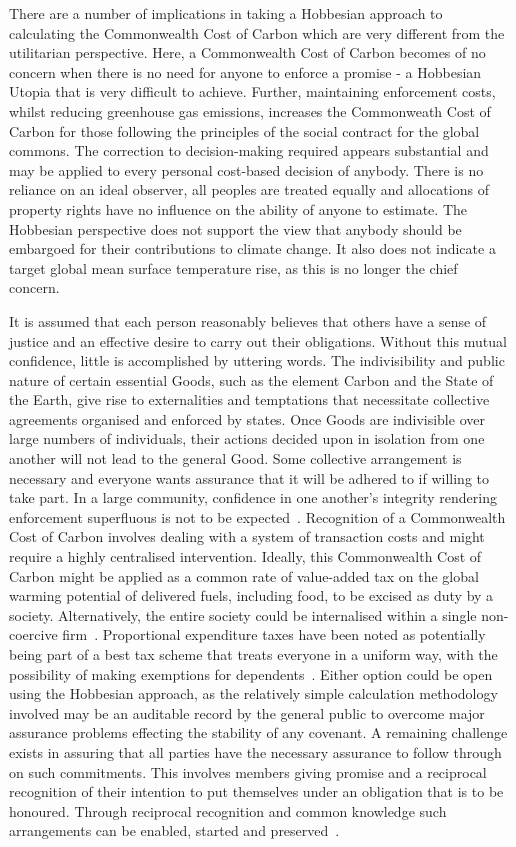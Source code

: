 \documentclass[11pt, oneside]{book}   	%
\begin{document}
There are a number of implications in taking a Hobbesian approach to calculating the Commonwealth Cost of Carbon which are very different from the utilitarian perspective.
Here, a Commonwealth Cost of Carbon becomes of no concern when there is no need for anyone to enforce a promise - a Hobbesian Utopia that is very difficult to achieve.
Further, maintaining enforcement costs, whilst reducing greenhouse gas emissions, increases the Commonweath Cost of Carbon for those following the principles of the social contract for the global commons.
The correction to decision-making required appears substantial and may be applied to every personal cost-based decision of anybody.
There is no reliance on an ideal observer, all peoples are treated equally and allocations of property rights have no influence on the ability of anyone to estimate.
The Hobbesian perspective does not support the view that anybody should be embargoed for their contributions to climate change.
It also does not indicate a target global mean surface temperature rise, as this is no longer the chief concern.\

It is assumed that each person reasonably believes that others have a sense of justice and an effective desire to carry out their obligations.
Without this mutual confidence, little is accomplished by uttering words.
The indivisibility and public nature of certain essential Goods, such as the element Carbon and the State of the Earth, give rise to externalities and temptations that necessitate collective agreements organised and enforced by states.
Once Goods are indivisible over large numbers of individuals, their actions decided upon in isolation from one another will not lead to the general Good.
Some collective arrangement is necessary and everyone wants assurance that it will be adhered to if willing to take part. In a large community, confidence in one another's integrity rendering enforcement superfluous is not to be expected~\cite{jr1}.
Recognition of a Commonwealth Cost of Carbon involves dealing with a system of transaction costs and might require a highly centralised intervention.
Ideally, this Commonwealth Cost of Carbon might be applied as a common rate of value-added tax on the global warming potential of delivered fuels, including food, to be excised as duty by a society.
Alternatively, the entire society could be internalised within a single non-coercive firm~\cite{rc1}.
Proportional expenditure taxes have been noted as potentially being part of a best tax scheme that treats everyone in a uniform way, with the possibility of making exemptions for dependents~\cite{nk1}.
Either option could be open using the Hobbesian approach, as the relatively simple calculation methodology involved may be an auditable record by the general public to overcome major assurance problems effecting the stability of any covenant.
A remaining challenge exists in assuring that all parties have the necessary assurance to follow through on such commitments.
This involves members giving promise and a reciprocal recognition of their intention to put themselves under an obligation that is to be honoured.
Through reciprocal recognition and common knowledge such arrangements can be enabled, started and preserved~\cite{hp1}.\
\end{document}
